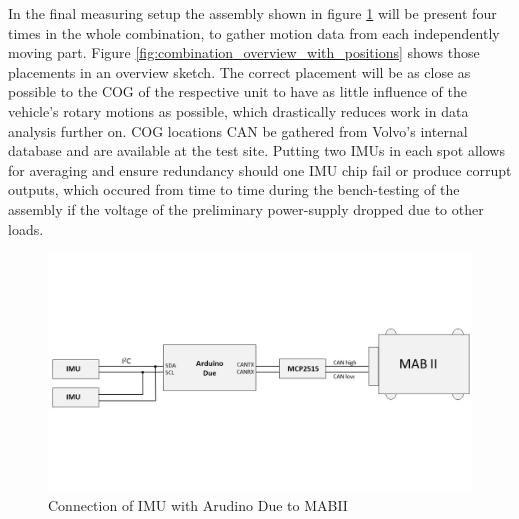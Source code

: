\documentclass[ExampleMasters.tex]{subfiles}
\begin{document}
In the final measuring setup the assembly shown in figure \ref{fig:IMU_overview} will be present four times in the whole combination, to gather motion data from each independently moving part. Figure \ref{fig:combination_overview_with_positions} shows those placements in an overview sketch. The correct placement will be as close as possible to the \gls{COG} of the respective unit to have as little influence of the vehicle's rotary motions as possible, which drastically reduces work in  data analysis further on. \gls{COG}  locations \gls{CAN} be gathered from Volvo's internal database and are available at the test site. Putting two \gls{IMU}s in each spot allows for averaging and ensure redundancy should one \gls{IMU} chip fail or produce corrupt outputs, which occured from time to time during the bench-testing of the assembly if the voltage of the preliminary power-supply dropped due to other loads.\\

\begin{figure}[!htb]
\centering
\includegraphics[width=1\linewidth]{figures/IMU_overview}
\caption{Connection of \gls{IMU} with Arudino Due to \gls{MABII}}
\label{fig:IMU_overview}
\end{figure}
\end{document}
